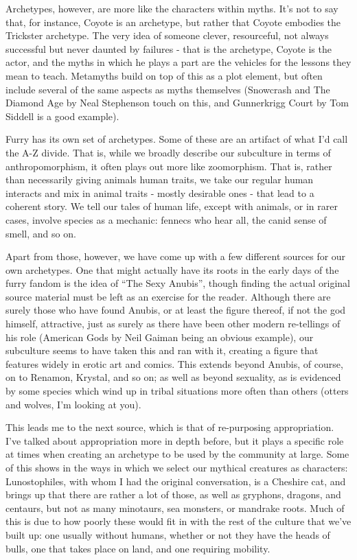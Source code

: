 Archetypes, however, are more like the characters within myths. It's not to say that, for instance, Coyote is an archetype, but rather that Coyote embodies the Trickster archetype. The very idea of someone clever, resourceful, not always successful but never daunted by failures - that is the archetype, Coyote is the actor, and the myths in which he plays a part are the vehicles for the lessons they mean to teach. Metamyths build on top of this as a plot element, but often include several of the same aspects as myths themselves (Snowcrash and The Diamond Age by Neal Stephenson touch on this, and Gunnerkrigg Court by Tom Siddell is a good example).

Furry has its own set of archetypes. Some of these are an artifact of what I'd call the A-Z divide. That is, while we broadly describe our subculture in terms of anthropomorphism, it often plays out more like zoomorphism. That is, rather than necessarily giving animals human traits, we take our regular human interacts and mix in animal traits - mostly desirable ones - that lead to a coherent story. We tell our tales of human life, except with animals, or in rarer cases, involve species as a mechanic: fennecs who hear all, the canid sense of smell, and so on.

Apart from those, however, we have come up with a few different sources for our own archetypes. One that might actually have its roots in the early days of the furry fandom is the idea of ``The Sexy Anubis'', though finding the actual original source material must be left as an exercise for the reader. Although there are surely those who have found Anubis, or at least the figure thereof, if not the god himself, attractive, just as surely as there have been other modern re-tellings of his role (American Gods by Neil Gaiman being an obvious example), our subculture seems to have taken this and ran with it, creating a figure that features widely in erotic art and comics. This extends beyond Anubis, of course, on to Renamon, Krystal, and so on; as well as beyond sexuality, as is evidenced by some species which wind up in tribal situations more often than others (otters and wolves, I'm looking at you).

This leads me to the next source, which is that of re-purposing appropriation. I've talked about appropriation more in depth before, but it plays a specific role at times when creating an archetype to be used by the community at large. Some of this shows in the ways in which we select our mythical creatures as characters: Lunostophiles, with whom I had the original conversation, is a Cheshire cat, and brings up that there are rather a lot of those, as well as gryphons, dragons, and centaurs, but not as many minotaurs, sea monsters, or mandrake roots. Much of this is due to how poorly these would fit in with the rest of the culture that we've built up: one usually without humans, whether or not they have the heads of bulls, one that takes place on land, and one requiring mobility.

